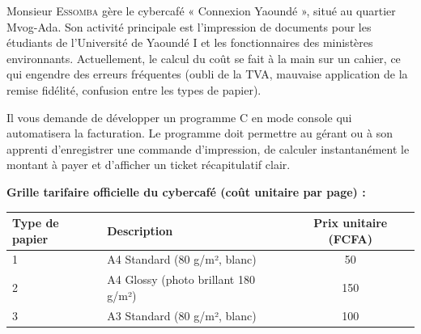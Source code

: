 \documentclass[11pt]{article}
\newcommand{\cle}[1]{{\popxbold\color{popdark}#1}}
\newcounter{popsec}
\newcounter{popsub}
\newcommand{\courssub}[1]{%
  \stepcounter{popsub}%
  \par\vspace{9pt}\noindent{\popxbold\fontsize{11.5}{13}\selectfont\color{popink}{\color{poporange}\thepopsec.\thepopsub}\hspace{6pt}#1}\par\nopagebreak\vspace{4pt}
}
\begin{document}
\courssub{Situation}
\begin{exemplebox}
Monsieur \textsc{Essomba} gère le cybercafé « Connexion Yaoundé », situé au quartier Mvog-Ada. Son activité principale est l'impression de documents pour les étudiants de l'Université de Yaoundé I et les fonctionnaires des ministères environnants. Actuellement, le calcul du coût se fait à la main sur un cahier, ce qui engendre des erreurs fréquentes (oubli de la TVA, mauvaise application de la remise fidélité, confusion entre les types de papier).

Il vous demande de développer un \cle{programme C} en mode console qui automatisera la facturation. Le programme doit permettre au gérant ou à son apprenti d'enregistrer une commande d'impression, de calculer instantanément le montant à payer et d'afficher un ticket récapitulatif clair.

\medskip
\textbf{Grille tarifaire officielle du cybercafé (coût unitaire par page) :}
\begin{center}
\begin{tabularx}{\linewidth}{|l|X|c|}
\hline
\rowcolor{popblueL}
\textbf{Type de papier} & \textbf{Description} & \textbf{Prix unitaire (FCFA)} \\
\hline
1 & A4 Standard (80 g/m², blanc) & 50 \\
2 & A4 Glossy (photo brillant 180 g/m²) & 150 \\
3 & A3 Standard (80 g/m², blanc) & 100 \\
\hline
\end{tabularx}
\end{center}


\end{exemplebox}
\end{document}
